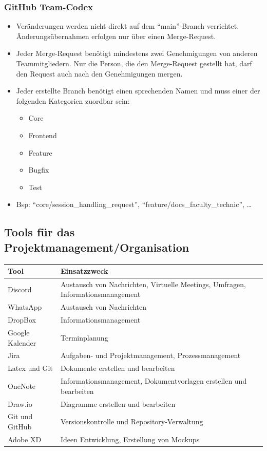 \documentclass[a4paper,11pt]{scrartcl}
\begin{document}
\subsubsection{GitHub Team-Codex }
\begin{itemize}
\item Veränderungen werden nicht direkt auf dem "`main"'-Branch verrichtet. Änderungsübernahmen erfolgen nur über einen Merge-Request.  
\item Jeder Merge-Request benötigt mindestens zwei Genehmigungen von anderen Teammitgliedern. Nur die Person, die den Merge-Request gestellt hat, darf den Request auch nach den Genehmigungen mergen. 
\item Jeder erstellte Branch benötigt einen sprechenden Namen und muss einer der folgenden Kategorien zuordbar sein: 
\begin{itemize}
\item Core
\item Frontend 
\item Feature 
\item Bugfix 
\item Test  
\end{itemize}
\item[] Bsp: "`core/session\_handling\_request"', "`feature/docs\_faculty\_technic"', …
\end{itemize}

\subsection{Tools für das Projektmanagement/Organisation}

\begin{table}[H]
\begin{tabular}{|p{4cm}|p{8cm}|}
\hline
\textbf{Tool} &\textbf{Einsatzzweck} \\ \hline
Discord &  Austausch von Nachrichten, Virtuelle Meetings, Umfragen, Informationsmanagement\\ \hline
WhatsApp &  Austausch von Nachrichten\\ \hline
DropBox & Informationsmanagement \\ \hline
Google Kalender & Terminplanung   \\ \hline
Jira &  Aufgaben- und Projektmanagement, Prozessmanagement \\ \hline
Latex und Git &  Dokumente erstellen und bearbeiten \\ \hline
OneNote &  Informationsmanagement, Dokumentvorlagen erstellen und bearbeiten \\ \hline
Draw.io &  Diagramme erstellen und bearbeiten \\ \hline
Git und GitHub & Versionskontrolle und Repository-Verwaltung \\ \hline
Adobe XD & Ideen Entwicklung, Erstellung von Mockups \\ \hline
\end{tabular}
\end{table}
\end{document}
